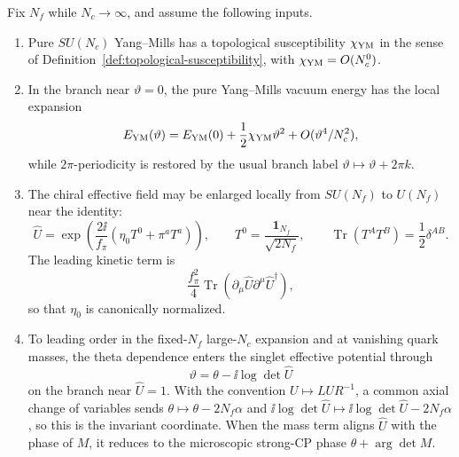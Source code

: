 \begin{hypothesis}
\label{hyp:large-n-singlet-theta-datum}
Fix \(N_f\) while \(N_c\to\infty\), and assume the following inputs.
\begin{enumerate}
\item Pure \(SU(N_c)\) Yang--Mills has a topological susceptibility
  \(\chi_{\rm YM}\) in the sense of
  Definition~\ref{def:topological-susceptibility}, with
  \(\chi_{\rm YM}=O(N_c^0)\).
\item In the branch near \(\vartheta=0\), the pure Yang--Mills vacuum energy
  has the local expansion
  \begin{equation}
    E_{\rm YM}(\vartheta)
    =
    E_{\rm YM}(0)
    +\frac12\chi_{\rm YM}\vartheta^2
    +O(\vartheta^4/N_c^2),
    \label{eq:large-n-ym-theta-local-expansion}
  \end{equation}
  while \(2\pi\)-periodicity is restored by the usual branch label
  \(\vartheta\mapsto \vartheta+2\pi k\).
\item The chiral effective field may be enlarged locally from \(SU(N_f)\) to
  \(U(N_f)\) near the identity:
  \begin{equation}
    \widehat U
    =
    \exp\!\left(\frac{2\ii}{f_\pi}
      (\eta_0T^0+\pi^aT^a)\right),
    \qquad
    T^0=\frac{\mathbf 1_{N_f}}{\sqrt{2N_f}},
    \qquad
    \operatorname{Tr}(T^AT^B)=\frac12\delta^{AB}.
    \label{eq:singlet-u-nf-field}
  \end{equation}
  The leading kinetic term is
  \begin{equation}
    \frac{f_\pi^2}{4}
    \operatorname{Tr}(\partial_\mu\widehat U\partial^\mu\widehat U^\dagger),
    \label{eq:singlet-u-nf-kinetic-term}
  \end{equation}
  so that \(\eta_0\) is canonically normalized.
\item To leading order in the fixed-\(N_f\) large-\(N_c\) expansion and at
  vanishing quark masses, the theta dependence enters the singlet effective
  potential through
  \begin{equation}
    \vartheta
    =
    \theta-\ii\log\det\widehat U
    \label{eq:singlet-theta-combination}
  \end{equation}
  on the branch near \(\widehat U=1\).  With the convention
  \(U\mapsto LUR^{-1}\), a common axial change of variables sends
  \(\theta\mapsto\theta-2N_f\alpha\) and
  \(\ii\log\det\widehat U\mapsto
  \ii\log\det\widehat U-2N_f\alpha\), so this is the invariant coordinate.
  When the mass term aligns \(\widehat U\) with the phase of \(M\), it reduces
  to the microscopic strong-CP phase \(\theta+\arg\det M\).
\end{enumerate}
\end{hypothesis}

